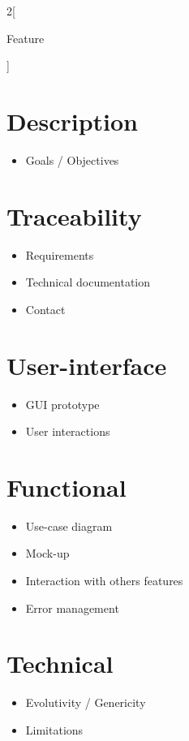 \documentclass[10pt]{article}
\begin{document}
  \begin{multicols}{2}[
    \begin{center}
      \Huge{Feature}
    \end{center}
    ]
  
    \section*{Description}
    \begin{itemize}
      \item Goals / Objectives
    \end{itemize}

    \section*{Traceability}
    \begin{itemize}
      \item Requirements
      \item Technical documentation
      \item Contact
    \end{itemize}
  
    \section*{User-interface}
    \begin{itemize}
      \item GUI prototype
      \item User interactions
    \end{itemize}
  
    \section*{Functional}
    \begin{itemize}
      \item Use-case diagram
      \item Mock-up
      \item Interaction with others features
      \item Error management
    \end{itemize}

    \section*{Technical}
    \begin{itemize}
      \item Evolutivity / Genericity
      \item Limitations
    \end{itemize}
  

\end{multicols}
\end{document}

